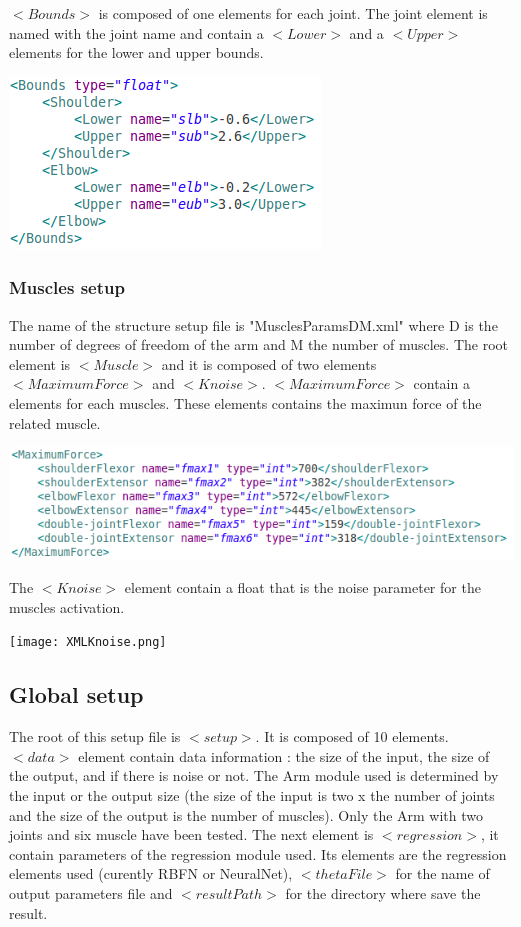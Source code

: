 \documentclass[a4paper]{article}
\begin{document}
$<Bounds>$ is composed of one elements for each joint. The joint element is named with the joint name and contain a $<Lower>$ and a $<Upper>$ elements for the lower and upper bounds.
\begin{flushleft}
\includegraphics[scale=0.5]{XMLBounds.png}
\end{flushleft}
\subsubsection{Muscles setup}
The name of the structure setup file is "MusclesParamsDM.xml" where D is the number of degrees of freedom of the arm and M the number of muscles.
The root element is $<Muscle>$ and it is composed of two elements $<MaximumForce>$ and $<Knoise>$.
$<MaximumForce>$ contain a elements for each muscles. These elements contains the maximun force of the related muscle.
\begin{flushleft}
\includegraphics[scale=0.5]{XMLForce.png}
\end{flushleft}
The $<Knoise>$ element contain a float that is the noise parameter for the muscles activation.
\begin{flushleft}
\texttt{[image: XMLKnoise.png]}
\end{flushleft}
\subsection{Global setup}
\label{global}
The root of this setup file is $<setup>$. It is composed of 10 elements.
$<data>$ element contain data information : the size of the input, the size of the output, and if there is noise or not. The Arm module used is determined by the input or the output size (the size of the input is two x the number of joints and the size of the output is the number of muscles). Only the Arm with two joints and six muscle have been tested.
The next element is $<regression>$, it contain parameters of the regression module used. Its elements are the regression elements used (curently RBFN or NeuralNet), $<thetaFile>$ for the name of output parameters file and $<resultPath>$ for the directory where save the result. 
\end{document}
